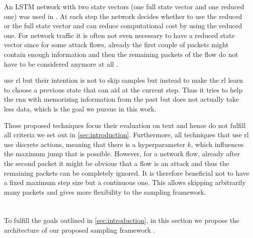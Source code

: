 \documentclass[conference]{IEEEtran}
\begin{document}
An LSTM network with two state vectors (one full state vector and one reduced one) was used in \cite{seo_neural_2018}. At each step the network decides whether to use the reduced or the full state vector and can reduce computational cost by using the reduced one. For network traffic it is often not even necessary to have a reduced state vector since for some attack flows, already the first couple of packets might contain enough information and then the remaining packets of the flow do not have to be considered anymore at all \cite{hartl_explainability_2020}.

\cite{gui_long_2019} use \gls{rl} but their intention is not to skip samples but instead to make the \gls{rl} learn to choose a previous state that can aid at the current step. Thus it tries to help the \gls{rnn} with memorizing information from the past but does not actually take less data, which is the goal we pursue in this work.



These proposed techniques focus their evaluation on text and hence do not fulfill all criteria we set out in \autoref{sec:introduction}. Furthermore, all techniques that use \gls{rl} use discrete actions, meaning that there is a hyperparameter $k$, which influences the maximum jump that is possible. However, for a network flow, already after the second packet it might be obvious that a flow is an attack and thus the remaining packets can be completely ignored. It is therefore beneficial not to have a fixed maximum step size but a continuous one. This allows skipping arbitrarily many packets and gives more flexibility  to the sampling framework.


\section{\ours{}}

To fulfill the goals outlined in \autoref{sec:introduction}, in this section we propose the architecture of our proposed sampling framework \ours.
\end{document}
